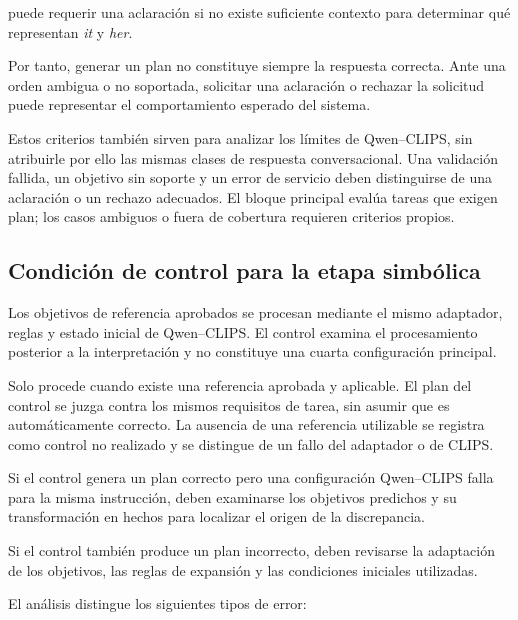 puede requerir una aclaración si no existe suficiente contexto para determinar
qué representan \textit{it} y \textit{her}.

Por tanto, generar un plan no constituye siempre la respuesta correcta. Ante
una orden ambigua o no soportada, solicitar una aclaración o rechazar la
solicitud puede representar el comportamiento esperado del sistema.

Estos criterios también sirven para analizar los límites de Qwen--CLIPS, sin atribuirle por ello las mismas clases de respuesta conversacional. Una validación fallida, un objetivo sin soporte y un error de servicio deben distinguirse de una aclaración o un rechazo adecuados. El bloque principal evalúa tareas que exigen plan; los casos ambiguos o fuera de cobertura requieren criterios propios.



\subsection{Condición de control para la etapa simbólica}
\label{subsec:control_clips}

Los objetivos de referencia aprobados se procesan mediante el mismo adaptador, reglas y estado inicial de Qwen--CLIPS. El control examina el procesamiento posterior a la interpretación y no constituye una cuarta configuración principal.



Solo procede cuando existe una referencia aprobada y aplicable. El plan del control se juzga contra los mismos requisitos de tarea, sin asumir que es automáticamente correcto. La ausencia de una referencia utilizable se registra como control no realizado y se distingue de un fallo del adaptador o de CLIPS.


Si el control genera un plan correcto pero una configuración
Qwen--CLIPS falla para la misma instrucción, deben examinarse los
objetivos predichos y su transformación en hechos para localizar
el origen de la discrepancia.

Si el control también produce un plan incorrecto, deben revisarse
la adaptación de los objetivos, las reglas de expansión y las
condiciones iniciales utilizadas.

El análisis distingue los siguientes tipos de error:

